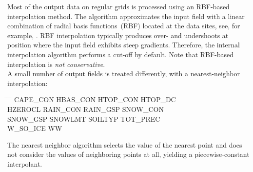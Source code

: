 Most of the output data on regular grids is processed using an RBF-based interpolation method.
The algorithm  approximates the input field with a linear combination of 
radial basis functions~(RBF) located at the data sites, see, for example, \cite{Ruppert2007}.
RBF interpolation typically produces over- and undershoots at position where the input field
exhibits steep gradients.
Therefore, the internal interpolation algorithm performs a cut-off by default.
Note that RBF-based interpolation is \emph{not conservative}.\\

A small number of output fields is treated differently, with a nearest-neighbor interpolation:
\begin{tabbing}
  \hspace{0.2\textwidth} \= \hspace{0.2\textwidth} \= \hspace{0.2\textwidth} \= \hspace{0.2\textwidth} \kill
  CAPE\_CON                  \>
  HBAS\_CON\footnotemark[6]  \>
  HTOP\_CON\footnotemark[6]  \>
  HTOP\_DC\footnotemark[6]   \\  
  HZEROCL\footnotemark[6]    \>
  RAIN\_CON  \>
  RAIN\_GSP  \>   
  SNOW\_CON  \\
  SNOW\_GSP  \>
  SNOWLMT    \>
  SOILTYP    \>
  TOT\_PREC  \\
  W\_SO\_ICE \>
  WW   
\end{tabbing}
The nearest neighbor algorithm selects the value of the nearest point and does
not consider the values of neighboring points at all, yielding a piecewise-constant interpolant. 




%  

